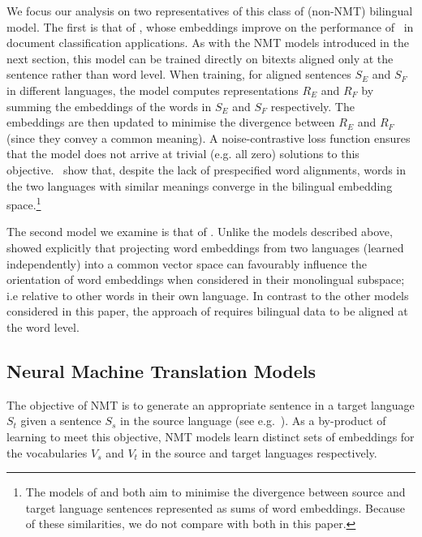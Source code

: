We focus our analysis on two representatives of this class of (non-NMT) bilingual model. The first is that of \cite{Hermann:2014:ICLR}, whose embeddings improve on the performance of~\cite{Klementiev} in document classification applications. As with the NMT models introduced in the next section, this model can be trained directly on bitexts aligned only at the sentence rather than word level. When training, for aligned sentences \(S_E\) and \(S_F\) in different languages, the model computes representations \(R_E\) and \(R_F\) by summing the embeddings of the words in \(S_E\) and \(S_F\) respectively. The embeddings are then updated to minimise the divergence between \(R_E\) and \(R_F\) (since they convey a common meaning). A noise-contrastive loss function ensures that the model does not arrive at trivial (e.g. all zero) solutions to this objective.~\cite{Hermann:2014:ICLR} show that, despite the lack of prespecified word alignments, words in the two languages with similar meanings converge in the bilingual embedding space.\footnote{The models of \cite{lauly2014autoencoder} and \cite{Hermann:2014:ICLR} both aim to minimise the divergence between source and target language sentences represented as sums of word embeddings. Because of these similarities, we do not compare with both in this paper.}

The second model we examine is that of \cite{faruqui2014improving}. Unlike the models described above, \cite{faruqui2014improving} showed explicitly that projecting word embeddings from two languages (learned independently) into a common vector space can favourably influence the orientation of word embeddings when considered in their monolingual subspace; i.e relative to other words in their own language.  In contrast to the other models considered in this paper, the approach of \cite{faruqui2014improving} requires bilingual data to be aligned at the word level.

\subsection{Neural Machine Translation Models}

The objective of NMT is to generate an appropriate sentence in a target
language \(S_t\)  given a sentence \(S_s\) in the source language (see e.g.~\cite{kalchbrenner13emnlp,Sutskever2014sequence}). As a by-product of learning to meet this objective, NMT models learn distinct sets of embeddings for the vocabularies \(V_ s\) and \(V_t\) in the source and target languages respectively.

